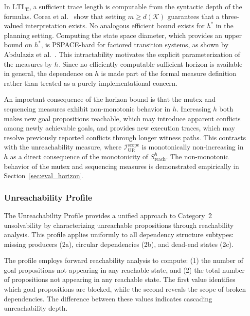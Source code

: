 In $\text{LTL}_{\text{ff}}$, a sufficient trace length is computable from the syntactic depth of the formulas. Corea et al.~\cite{Corea2024} show that setting $m \geq d(\mathcal{K})$ guarantees that a three-valued interpretation exists. No analogous efficient bound exists for $h^*$ in the planning setting. Computing the state space diameter, which provides an upper bound on $h^*$, is PSPACE-hard for factored transition systems, as shown by Abdulaziz et al.~\cite{Abdulaziz2018}. This intractability motivates the explicit parameterization of the measures by $h$. Since no efficiently computable sufficient horizon is available in general, the dependence on $h$ is made part of the formal measure definition rather than treated as a purely implementational concern.

An important consequence of the horizon bound is that the mutex and sequencing measures exhibit non-monotonic behavior in $h$. Increasing $h$ both makes new goal propositions reachable, which may introduce apparent conflicts among newly achievable goals, and provides new execution traces, which may resolve previously reported conflicts through longer witness paths. This contrasts with the unreachability measure, where $\mathcal{I}^{\text{scope}}_{\text{UR}}$ is monotonically non-increasing in $h$ as a direct consequence of the monotonicity of $S^h_{\text{reach}}$. The non-monotonic behavior of the mutex and sequencing measures is demonstrated empirically in Section~\ref{sec:eval_horizon}.

\subsubsection{Unreachability Profile}
\label{sec:unreachability_profile}

The Unreachability Profile provides a unified approach to Category~2 unsolvability by characterizing unreachable propositions through reachability analysis. This profile applies uniformly to all dependency structure subtypes: missing producers (2a), circular dependencies (2b), and dead-end states (2c).

The profile employs forward reachability analysis to compute: (1) the number of goal propositions not appearing in any reachable state, and (2) the total number of propositions not appearing in any reachable state. The first value identifies which goal propositions are blocked, while the second reveals the scope of broken dependencies. The difference between these values indicates cascading unreachability depth.

